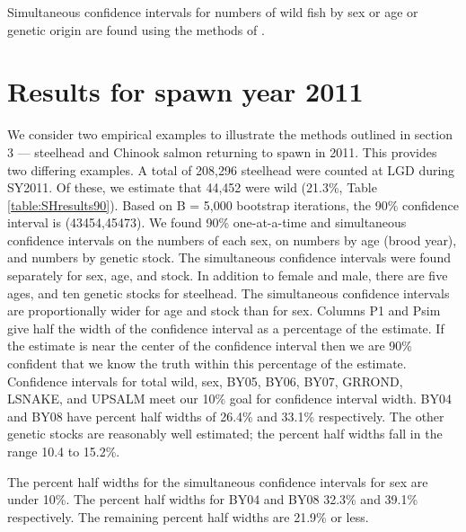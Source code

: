 \documentclass[11pt]{article}
\begin{document}
Simultaneous confidence intervals for numbers of wild fish by sex or age or genetic origin are found using the methods of . 

\section{Results for spawn year 2011}
\label{sec:results}

We consider two empirical examples to illustrate the methods outlined in section 3 –-- steelhead and Chinook salmon returning to spawn in 2011. This provides two differing examples. A total of 208,296 steelhead were counted at LGD during SY2011. Of these, we estimate that 44,452 were wild (21.3\%, Table \ref{table:SHresults90}).  Based on B = 5,000 bootstrap iterations, the 90\% confidence interval is (43454,45473). We found 90\% one-at-a-time and simultaneous confidence intervals on the numbers of each sex, on numbers by age (brood year), and numbers by genetic stock. The simultaneous confidence intervals were found separately for sex, age, and stock. In addition to female and male, there are five ages, and ten genetic stocks for steelhead. The simultaneous confidence intervals are proportionally wider for age and stock than for sex. Columns P1 and Psim give half the width of the confidence interval as a percentage of the estimate. If the estimate is near the center of the confidence interval then we are 90\% confident that we know the truth within this percentage of the estimate. Confidence intervals for total wild, sex, BY05, BY06, BY07, GRROND, LSNAKE, and UPSALM meet our 10\% goal for confidence interval width. BY04 and BY08 have percent half widths of 26.4\% and 33.1\% respectively. The other genetic stocks are reasonably well estimated; the percent half widths fall in the range 10.4 to 15.2\%.

The percent half widths for the simultaneous confidence intervals for sex are under 10\%.  The percent half widths for BY04 and BY08 32.3\% and 39.1\% respectively. The remaining percent half widths are 21.9\% or less.
\end{document}
